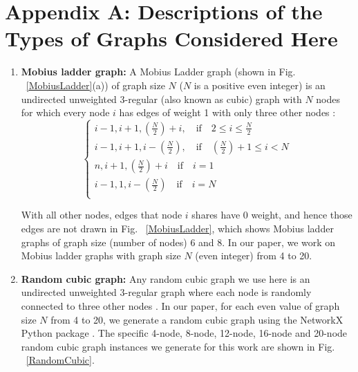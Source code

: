 \documentclass[%
 reprint,
 amsmath,amssymb,
 aps,
]{revtex4-2}
\begin{document}
\section*{Appendix A: Descriptions of the Types of Graphs Considered Here}



\begin{enumerate}
    \item \textbf{Mobius ladder graph:} 
     A Mobius Ladder graph (shown in Fig. ~\ref{MobiusLadder}(a)) of graph size $N$ ($N$ is a positive even integer) is an undirected unweighted 3-regular (also known as cubic) graph with $N$ nodes for which every node $i$ has edges of weight 1 with only three other nodes \citep{Ref_MobiusLadder}:
$$
\begin{cases}
i-1, i+1, (\frac{N}{2})+i, \hspace{1em} \text{if} \hspace{1em}  2 \leq i \leq \frac{N}{2} \\
i-1, i+1, i-(\frac{N}{2}), \hspace{1em} \text{if} \hspace{1em}  (\frac{N}{2})+1 \leq i < N \\
n, i+1, (\frac{N}{2})+i \hspace{1em} \text{if} \hspace{1em} i = 1\\
i-1, 1, i-(\frac{N}{2}) \hspace{1em} \text{if} \hspace{1em} i = N  \\
\end{cases}
$$

With all other nodes, edges that node $i$ shares have 0 weight, and hence those edges are not drawn in  Fig. ~\ref{MobiusLadder}, which shows Mobius ladder graphs of graph size (number of nodes) 6 and 8. In our paper, we work on Mobius ladder graphs with graph size $N$ (even integer) from 4 to 20.



\item \textbf{Random cubic graph:}  Any random cubic graph we use here is an undirected unweighted 3-regular graph where each node is randomly connected to three other nodes \citep{Ref_RandomCubic}. In our paper, for each even value of graph size $N$ from 4 to 20, we generate a random cubic graph using the NetworkX Python package \citep{SciPyProceedings_11, Ref_RandomCubic,gen_random_reg}. The specific 4-node, 8-node, 12-node, 16-node and 20-node random cubic graph instances we generate for this work are shown in Fig. ~\ref{RandomCubic}.



\end{enumerate}
\end{document}
